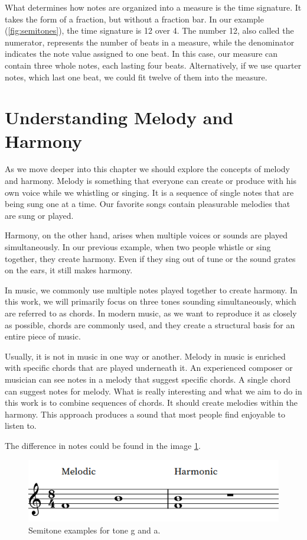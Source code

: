 What determines how notes are organized into a measure is the time signature. It takes the form of a fraction, but without a fraction bar. In our example (\ref{fig:semitones}), the time signature is 12 over 4. The number 12, also called the numerator, represents the number of beats in a measure, while the denominator indicates the note value assigned to one beat. In this case, our measure can contain three whole notes, each lasting four beats. Alternatively, if we use quarter notes, which last one beat, we could fit twelve of them into the measure.

\section{Understanding Melody and Harmony}
As we move deeper into this chapter we should explore the concepts of melody and harmony. Melody is something that everyone can create or produce with his own voice while we whistling or singing. It is a sequence of single notes that are being sung one at a time. Our favorite songs contain pleasurable melodies that are sung or played.

Harmony, on the other hand, arises when multiple voices or sounds are played simultaneously. In our previous example, when two people whistle or sing together, they create harmony. Even if they sing out of tune or the sound grates on the ears, it still makes harmony.

In music, we commonly use multiple notes played together to create harmony. In this work, we will primarily focus on three tones sounding simultaneously, which are referred to as chords. In modern music, as we want to reproduce it as closely as possible, chords are commonly used, and they create a structural basis for an entire piece of music.

Usually, it is not in music in one way or another. Melody in music is enriched with specific chords that are played underneath it. An experienced composer or musician can see notes in a melody that suggest specific chords. A single chord can suggest notes for melody. What is really interesting and what we aim to do in this work is to combine sequences of chords. It should create melodies within the harmony. This approach produces a sound that most people find enjoyable to listen to.

The difference in notes could be found in the image \ref{fig:harmonicmelodic}.
\begin{figure}[H]
    \centering
    \includegraphics[scale=0.55]{obrazky-figures/harmonicmelodic.png}
    \caption{Semitone examples for tone g and a.}
    \label{fig:harmonicmelodic}
\end{figure}

